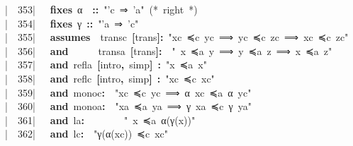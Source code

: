 \documentclass{article}
\newcommand{\syntaxCOMMENTA}[1]{\textcolor[rgb]{0.8,0.0,0.0}{#1}}
\newcommand{\syntaxKEYWORDB}[1]{\textcolor[rgb]{0.0,0.6,0.4}{\textbf{#1}}}
\newcommand{\syntaxLITERALA}[1]{\textcolor[rgb]{1.0,0.0,0.8}{#1}}
\newcommand{\syntaxOPERATOR}[1]{\textcolor[rgb]{0.0,0.0,0.0}{\textbf{#1}}}
\newcommand{\syntaxCOMMENTA}[1]{\textcolor[rgb]{0.8,0.0,0.0}{#1}}
\newcommand{\syntaxKEYWORDB}[1]{\textcolor[rgb]{0.0,0.6,0.4}{\textbf{#1}}}
\newcommand{\syntaxLITERALA}[1]{\textcolor[rgb]{1.0,0.0,0.8}{#1}}
\newcommand{\syntaxOPERATOR}[1]{\textcolor[rgb]{0.0,0.0,0.0}{\textbf{#1}}}
\newcommand{\syntaxCOMMENTA}[1]{\textcolor[rgb]{0.8,0.0,0.0}{#1}}
\newcommand{\syntaxKEYWORDB}[1]{\textcolor[rgb]{0.0,0.6,0.4}{\textbf{#1}}}
\newcommand{\syntaxLITERALA}[1]{\textcolor[rgb]{1.0,0.0,0.8}{#1}}
\newcommand{\syntaxOPERATOR}[1]{\textcolor[rgb]{0.0,0.0,0.0}{\textbf{#1}}}
\newcommand{\syntaxCOMMENTA}[1]{\textcolor[rgb]{0.8,0.0,0.0}{\textbf{#1}}}
\newcommand{\syntaxKEYWORDB}[1]{\textcolor[rgb]{0.0,0.6,0.4}{#1}}
\newcommand{\syntaxLITERALA}[1]{\textcolor[rgb]{1.0,0.0,0.8}{\textbf{#1}}}
\newcommand{\syntaxOPERATOR}[1]{\textcolor[rgb]{0.0,0.0,0.0}{#1}}
\newcommand{\syntaxCOMMENTA}[1]{\textcolor[rgb]{0.8,0.0,0.0}{#1}}
\newcommand{\syntaxKEYWORDB}[1]{\textcolor[rgb]{0.0,0.6,0.4}{\textbf{#1}}}
\newcommand{\syntaxLITERALA}[1]{\textcolor[rgb]{1.0,0.0,0.8}{#1}}
\newcommand{\syntaxOPERATOR}[1]{\textcolor[rgb]{0.0,0.0,0.0}{\textbf{#1}}}
\newcommand{\syntaxCOMMENTA}[1]{\textcolor[rgb]{0.8,0.0,0.0}{#1}}
\newcommand{\syntaxKEYWORDB}[1]{\textcolor[rgb]{0.0,0.6,0.4}{\textbf{#1}}}
\newcommand{\syntaxLITERALA}[1]{\textcolor[rgb]{1.0,0.0,0.8}{#1}}
\newcommand{\syntaxOPERATOR}[1]{\textcolor[rgb]{0.0,0.0,0.0}{\textbf{#1}}}
\newcommand{\syntaxCOMMENTA}[1]{\textcolor[rgb]{0.0,0.0,0.0}{#1}}
\newcommand{\syntaxKEYWORDB}[1]{\textcolor[rgb]{0.0,0.0,0.0}{#1}}
\newcommand{\gutter}[1]{\textcolor[rgb]{0,0,0}{{|}#1}}
\newcommand{\gutterH}[1]{\textcolor[rgb]{1,0,0}{{|}#1}}
\begin{document}
\gutter{\ \ 353{|}\ }{\ }{\ }\syntaxKEYWORDB{fixes}{\ }α{\ }{\ }\syntaxOPERATOR{::}{\ }\syntaxLITERALA{"'c{\ }⇒{\ }'a"}{\ }\syntaxCOMMENTA{(*{\ }right{\ }*)}\hspace*{\fill}\\
\gutter{\ \ 354{|}\ }{\ }{\ }\syntaxKEYWORDB{fixes}{\ }γ{\ }\syntaxOPERATOR{::}{\ }\syntaxLITERALA{"'a{\ }⇒{\ }'c"}{\ }\hspace*{\fill}\\
\gutterH{\ \ 355{|}\ }{\ }{\ }\syntaxKEYWORDB{assumes}{\ }{\ }transc{\ }\syntaxOPERATOR{{[}}trans\syntaxOPERATOR{{]}}\syntaxOPERATOR{:}{\ }\syntaxLITERALA{"xc{\ }≼c{\ }yc{\ }⟹{\ }yc{\ }≼c{\ }zc{\ }⟹{\ }xc{\ }≼c{\ }zc"}\hspace*{\fill}\\
\gutter{\ \ 356{|}\ }{\ }{\ }\syntaxKEYWORDB{and}{\ }{\ }{\ }{\ }{\ }{\ }transa{\ }\syntaxOPERATOR{{[}}trans\syntaxOPERATOR{{]}}\syntaxOPERATOR{:}{\ }{\ }\syntaxLITERALA{"{\ }x{\ }≼a{\ }y{\ }⟹{\ }y{\ }≼a{\ }z{\ }⟹{\ }x{\ }≼a{\ }z"}{\ }\hspace*{\fill}\\
\gutter{\ \ 357{|}\ }{\ }{\ }\syntaxKEYWORDB{and}{\ }refla{\ }\syntaxOPERATOR{{[}}intro\syntaxOPERATOR{,}{\ }simp\syntaxOPERATOR{{]}}{\ }\syntaxOPERATOR{:}{\ }\syntaxLITERALA{"x{\ }≼a{\ }x"}\hspace*{\fill}\\
\gutter{\ \ 358{|}\ }{\ }{\ }\syntaxKEYWORDB{and}{\ }reflc{\ }\syntaxOPERATOR{{[}}intro\syntaxOPERATOR{,}{\ }simp\syntaxOPERATOR{{]}}{\ }\syntaxOPERATOR{:}{\ }\syntaxLITERALA{"xc{\ }≼c{\ }xc"}\hspace*{\fill}\\
\gutter{\ \ 359{|}\ }{\ }{\ }\syntaxKEYWORDB{and}{\ }monoc\syntaxOPERATOR{:}{\ }{\ }\syntaxLITERALA{"xc{\ }≼c{\ }yc{\ }⟹{\ }α{\ }xc{\ }≼a{\ }α{\ }yc"}\hspace*{\fill}\\
\gutterH{\ \ 360{|}\ }{\ }{\ }\syntaxKEYWORDB{and}{\ }monoa\syntaxOPERATOR{:}{\ }{\ }\syntaxLITERALA{"xa{\ }≼a{\ }ya{\ }⟹{\ }γ{\ }xa{\ }≼c{\ }γ{\ }ya"}\hspace*{\fill}\\
\gutter{\ \ 361{|}\ }{\ }{\ }\syntaxKEYWORDB{and}{\ }la\syntaxOPERATOR{:}{\ }{\ }{\ }{\ }{\ }{\ }{\ }{\ }\syntaxLITERALA{"{\ }x{\ }≼a{\ }α(γ(x))"}\hspace*{\fill}\\
\gutter{\ \ 362{|}\ }{\ }{\ }\syntaxKEYWORDB{and}{\ }lc\syntaxOPERATOR{:}{\ }{\ }\syntaxLITERALA{"γ(α(xc)){\ }≼c{\ }xc"}\hspace*{\fill}\\
\end{document}
